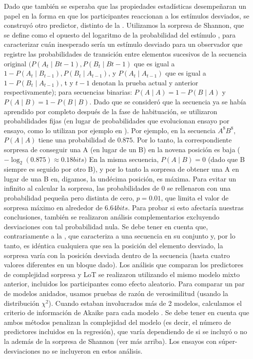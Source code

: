 Dado que también se esperaba que las propiedades estadísticas desempeñaran un papel en la forma en que los participantes reaccionan a los estímulos desviados, se construyó otro predictor, distinto de la \mdlbin. Utilizamos la sorpresa de Shannon, que se define como el opuesto del logaritmo de la probabilidad del estímulo \cite{f21,f80,f82,f83,f84}, para caracterizar cuán inesperado sería un estímulo desviado para un observador que registre las probabilidades de transición entre elementos sucesivos de la secuencia original $(P(A_t \mid B{t-1 }), P(B_t \mid B{t-1})$ que es igual a $1 - P(A_t \mid B_{t-1}), P(B_t \mid A_{t-1})$, y $P(A_t \mid A_{t-1})$ que es igual a $1-P(B_t \mid A_{t-1})$, t y $t-1$ denotan la prueba actual y anterior respectivamente); para secuencias binarias: $P(A \mid A) = 1 - P (B \mid A)$ y $P(A \mid B) = 1 - P (B \mid B)$. Dado que se consideró que la secuencia ya se había aprendido por completo después de la fase de habituación, se utilizaron probabilidades fijas (en lugar de probabilidades que evolucionan ensayo por ensayo, como lo utilizan por ejemplo en \cite{f19,f20,f80}). Por ejemplo, en la secuencia $A^8B^8$, $P(A \mid A)$ tiene una probabilidad de $0.875$. Por lo tanto, la correspondiente sorpresa de conseguir una A (en lugar de un B) en la novena posición es baja ($-\log_2(0.875) \approx 0.18 bits)$ En la misma secuencia, $P(A \mid B) = 0$ (dado que B siempre es seguido por otro B), y por lo tanto la sorpresa de obtener una A en lugar de una B en, digamos, la undécima posición, es máxima. Para evitar un infinito al calcular la sorpresa, las probabilidades de 0 se rellenaron con una probabilidad pequeña pero distinta de cero, $p = 0.01$, que limita el valor de sorpresa máximo en alrededor de $6.64 bits$. Para probar si esto afectaría nuestras conclusiones, también se realizaron análisis complementarios excluyendo desviaciones con tal probabilidad nula. Se debe tener en cuenta que, contrariamente a la \mdlbin, que caracteriza a una secuencia en su conjunto y, por lo tanto, es idéntica cualquiera que sea la posición del elemento desviado, la sorpresa varía con la posición desviada dentro de la secuencia (hasta cuatro valores diferentes en un bloque dado). Los análisis que comparan los predictores de complejidad sorpresa y LoT se realizaron utilizando el mismo modelo mixto anterior, incluidos los participantes como efecto aleatorio. Para comparar un par de modelos anidados, usamos pruebas de razón de verosimilitud (usando la distribución $\chi^2$). Cuando estaban involucrados más de 2 modelos, calculamos el criterio de información de Akaike para cada modelo \cite{f140}. Se debe tener en cuenta que ambos métodos penalizan la complejidad del modelo (es decir, el número de predictores incluidos en la regresión), que varía dependiendo de si se incluyó o no la \mdlbin además de la sorpresa de Shannon (ver más arriba). Los ensayos con súper-desviaciones no se incluyeron en estos análisis.

